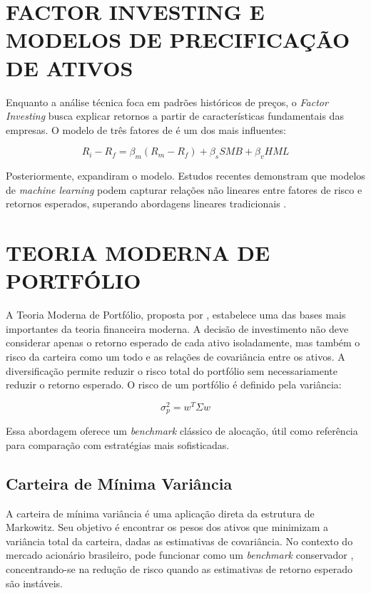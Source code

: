 \documentclass{eic-bcc-tcc}
\begin{document}
\section{FACTOR INVESTING E MODELOS DE PRECIFICAÇÃO DE ATIVOS}

Enquanto a análise técnica foca em padrões históricos de preços, o \textit{Factor Investing} busca explicar retornos a partir de características fundamentais das empresas. O modelo de três fatores de \citep{FamaFrench1993} é um dos mais influentes:

\begin{equation}
R_i - R_f = \beta_m (R_m - R_f) + \beta_s SMB + \beta_v HML
\end{equation}

Posteriormente, \citep{FamaFrench2015} expandiram o modelo. Estudos recentes demonstram que modelos de \textit{machine learning} podem capturar relações não lineares entre fatores de risco e retornos esperados, superando abordagens lineares tradicionais \citep{Gu2020}.

\section{TEORIA MODERNA DE PORTFÓLIO}

A Teoria Moderna de Portfólio, proposta por \citet{Markowitz1952}, estabelece uma das bases mais importantes da teoria financeira moderna. A decisão de investimento não deve considerar apenas o retorno esperado de cada ativo isoladamente, mas também o risco da carteira como um todo e as relações de covariância entre os ativos. A diversificação permite reduzir o risco total do portfólio sem necessariamente reduzir o retorno esperado. O risco de um portfólio é definido pela variância:

\begin{equation}
\sigma_p^2 = w^T \Sigma w
\end{equation}

Essa abordagem oferece um \textit{benchmark} clássico de alocação, útil como referência para comparação com estratégias mais sofisticadas.

\subsection{Carteira de Mínima Variância}
A carteira de mínima variância é uma aplicação direta da estrutura de Markowitz. Seu objetivo é encontrar os pesos dos ativos que minimizam a variância total da carteira, dadas as estimativas de covariância. No contexto do mercado acionário brasileiro, pode funcionar como um \textit{benchmark} conservador \citep{Clarke2006}, concentrando-se na redução de risco quando as estimativas de retorno esperado são instáveis.
\end{document}
